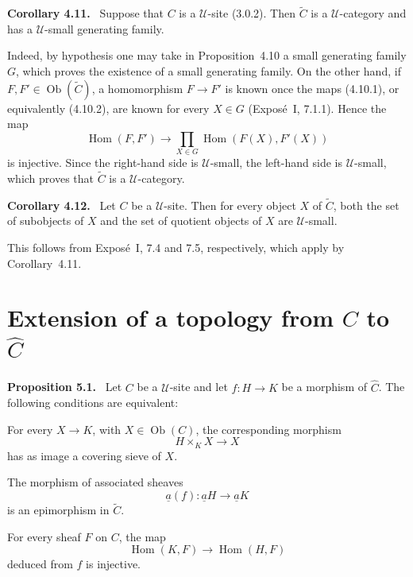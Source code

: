 \documentclass[11pt]{article}
\newcommand{\U}{\mathcal{U}}
\newcommand{\Hom}{\operatorname{Hom}}
\newcommand{\Ob}{\operatorname{Ob}}
\newenvironment{statement}[1]{\par\medskip\noindent\textbf{#1.}\ }{\par\medskip}
\begin{document}
\begin{statement}{Corollary 4.11}
Suppose that \(C\) is a \(\U\)-site (3.0.2). Then \(\widetilde C\) is a \(\U\)-category and has a \(\U\)-small generating family.
\end{statement}

Indeed, by hypothesis one may take in Proposition~4.10 a small generating family \(G\), which proves the existence of a small generating family. On the other hand, if \(F,F'\in\Ob(\widetilde C)\), a homomorphism \(F\to F'\) is known once the maps (4.10.1), or equivalently (4.10.2), are known for every \(X\in G\) (Expos\'e~I, 7.1.1). Hence the map
\[
\Hom(F,F')\longrightarrow \prod_{X\in G}\Hom(F(X),F'(X))
\]
is injective. Since the right-hand side is \(\U\)-small, the left-hand side is \(\U\)-small, which proves that \(\widetilde C\) is a \(\U\)-category.

\begin{statement}{Corollary 4.12}
Let \(C\) be a \(\U\)-site. Then for every object \(X\) of \(\widetilde C\), both the set of subobjects of \(X\) and the set of quotient objects of \(X\) are \(\U\)-small.
\end{statement}

This follows from Expos\'e~I, 7.4 and 7.5, respectively, which apply by Corollary~4.11.

\section{Extension of a topology from \(C\) to \(\widehat C\)}

\begin{statement}{Proposition 5.1}
Let \(C\) be a \(\U\)-site and let \(f:H\to K\) be a morphism of \(\widehat C\). The following conditions are equivalent:
\begin{description}[leftmargin=2.8em]
\item[(i)] For every \(X\to K\), with \(X\in\Ob(C)\), the corresponding morphism
\[
H\times_KX\to X
\]
has as image a covering sieve of \(X\).
\item[(ii)] The morphism of associated sheaves
\[
\underline a(f):\underline aH\to\underline aK
\]
is an epimorphism in \(\widetilde C\).
\item[(ii bis)] For every sheaf \(F\) on \(C\), the map
\[
\Hom(K,F)\to \Hom(H,F)
\]
deduced from \(f\) is injective.
\end{description}
\end{statement}
\end{document}
